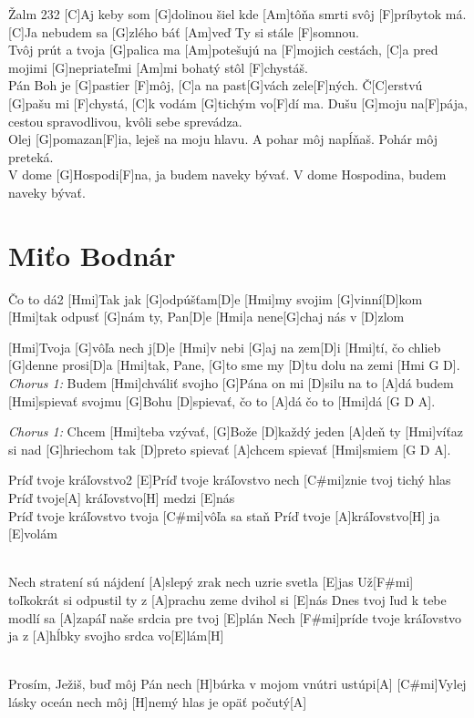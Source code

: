 \documentclass[12pt]{article}
\begin{document}
\begin{song}{Žalm 23}{2}
	[C]Aj keby som [G]dolinou šiel 
	kde [Am]tôňa smrti svôj [F]príbytok má.
	[C]Ja nebudem sa [G]zlého báť 
	[Am]veď Ty si stále [F]somnou.
	\\
	[C]Tvôj prút a tvoja [G]palica ma 
	[Am]potešujú na [F]mojich cestách,
	[C]a pred mojimi [G]nepriateľmi 
	[Am]mi bohatý stôl [F]chystáš.
	\\
	[C]Pán Boh je [G]pastier [F]môj,
	[C]a na past[G]vách zele[F]ných.
	Č[C]erstvú [G]pašu mi [F]chystá,
	[C]k vodám [G]tichým vo[F]dí ma.
	\columnbreak
	[C]Dušu [G]moju na[F]pája,
	cestou spravodlivou,
	kvôli sebe sprevádza.
	\\
	[C]Olej [G]pomazan[F]ia,
	leješ na moju hlavu.
	A pohar môj napĺňaš.
	Pohár môj preteká.
	\\
	[C]V dome [G]Hospodi[F]na,
	ja budem naveky bývať.
	V dome Hospodina,
	budem naveky bývať.
\end{song}



\newpage

\section{Miťo Bodnár}

\begin{song}{Čo to dá}{2}
	[Hmi]Tak jak [G]odpúšťam[D]e
	[Hmi]my svojim [G]vinní[D]kom
	[Hmi]tak odpusť [G]nám ty, Pan[D]e
	[Hmi]a nene[G]chaj nás v [D]zlom
	
	[Hmi]Tvoja [G]vôľa nech j[D]e
	[Hmi]v nebi [G]aj na zem[D]i
	[Hmi]tí, čo chlieb [G]denne prosi[D]a
	[Hmi]tak, Pane, [G]to sme my
	[D]tu dolu na zemi [Hmi G D].
	\columnbreak
	\textit{\color{gray}Chorus 1:}
	Budem [Hmi]chváliť svojho [G]Pána
	on mi [D]silu na to [A]dá
	budem [Hmi]spievať svojmu [G]Bohu
	[D]spievať, čo to [A]dá
	čo to [Hmi]dá [G D A].
	
	\textit{\color{gray}Chorus 1:}
	Chcem [Hmi]teba vzývať, [G]Bože
	[D]každý jeden [A]deň
	ty [Hmi]víťaz si nad [G]hriechom
	tak [D]preto spievať [A]chcem
	spievať [Hmi]smiem [G D A].
\end{song}


\begin{song}{Príď tvoje kráľovstvo}{2}
	[E]Príď tvoje kráľovstvo
	nech [C#mi]znie tvoj tichý hlas
	Príď tvoje[A] kráľovstvo[H]
	medzi [E]nás
	\\
	[E]Príď tvoje kráľovstvo
	tvoja [C#mi]vôľa sa staň
	Príď tvoje [A]kráľovstvo[H]
	ja [E]volám
	
	\\
	[F#mi]Nech stratení sú nájdení
	[A]slepý zrak nech uzrie svetla [E]jas
	Už[F#mi] toľkokrát si odpustil
	ty z [A]prachu zeme dvihol si [E]nás
	\columnbreak
	[F#mi]Dnes tvoj ľud k tebe modlí sa
	[A]zapáľ naše srdcia pre tvoj [E]plán
	Nech [F#mi]príde tvoje kráľovstvo
	ja z [A]hĺbky svojho srdca vo[E]lám[H]
	
	\\
	[C#mi]Prosím, Ježiš, buď môj Pán
	nech [H]búrka v mojom vnútri ustúpi[A]
	[C#mi]Vylej lásky oceán
	nech môj [H]nemý hlas je opäť počutý[A]
\end{song}
\end{document}
